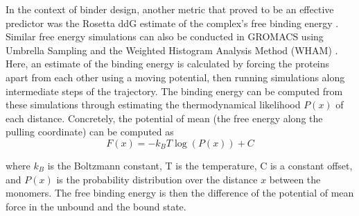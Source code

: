 In the context of binder design, another metric that proved to be an effective predictor was the Rosetta ddG estimate of the complex's free binding energy \cite{physics_binder_design}. Similar free energy simulations can also be conducted in GROMACS using Umbrella Sampling and the Weighted Histogram Analysis Method (WHAM) \cite{wham_method}. Here, an estimate of the binding energy is calculated by forcing the proteins apart from each other using a moving potential, then running simulations along intermediate steps of the trajectory. The binding energy can be computed from these simulations through estimating the thermodynamical likelihood $P(x)$ of each distance. Concretely, the potential of mean (the free energy along the pulling coordinate) can be computed as 
\begin{equation}
    F(x) = -k_B T \log(P(x)) + C
\end{equation}

where $k_B$ is the Boltzmann constant, T is the temperature, C is a constant offset, and $P(x)$ is the probability distribution over the distance $x$ between the monomers. The free binding energy is then the difference of the potential of mean force in the unbound and the bound state. 

